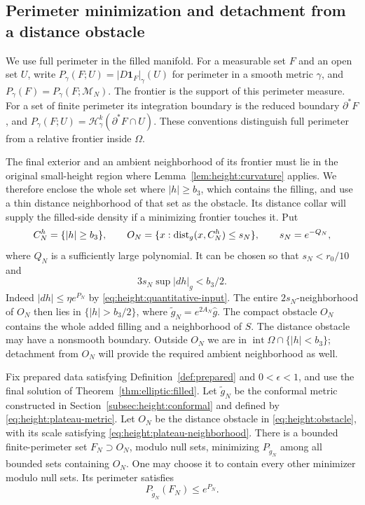 \subsection{Perimeter minimization and detachment from a distance obstacle}

We use full perimeter in the filled manifold.  For a measurable set
$F$ and an open set $U$, write
$P_\gamma(F;U)=|D\mathbf1_F|_\gamma(U)$ for perimeter in a smooth
metric $\gamma$, and $P_\gamma(F)=P_\gamma(F;\mathcal M_N)$.
The frontier is the support of this perimeter measure.  For a set of
finite perimeter its integration boundary is the reduced boundary
$\partial^*F$, and
$P_\gamma(F;U)=\mathcal H^k_\gamma(\partial^*F\cap U)$.
These conventions distinguish full perimeter from a relative frontier
inside $\Omega$.

The final exterior and an ambient neighborhood of its frontier must
lie in the original small-height region where
Lemma~\ref{lem:height:curvature} applies. We therefore enclose the
whole set where $|h|\ge b_3$, which contains the filling, and use a
thin distance neighborhood of that set as the obstacle. Its distance
collar will supply the filled-side density if a minimizing frontier
touches it. Put
\begin{equation}\label{eq:height:obstacle}
 C_N^h=\{|h|\ge b_3\},\qquad
 O_N=\{x:\operatorname{dist}_g(x,C_N^h)\le s_N\},
 \qquad s_N=e^{-Q_N},
\end{equation}
where $Q_N$ is a sufficiently large polynomial.  It can be chosen so
that $s_N<r_0/10$ and
\begin{equation}\label{eq:height:plateau-neighborhood}
 3s_N\sup|dh|_g<b_3/2.
\end{equation}
Indeed $|dh|\le\eta e^{P_N}$ by
\eqref{eq:height:quantitative-input}.  The entire
$2s_N$-neighborhood of $O_N$ then lies in $\{|h|>b_3/2\}$, where
$\widetilde g_N=e^{2A_N}\widehat g$.  The compact obstacle $O_N$
contains the whole added filling and a neighborhood of $S$.
The distance obstacle may have a nonsmooth boundary.  Outside $O_N$
we are in $\operatorname{int}\Omega\cap\{|h|<b_3\}$; detachment from
$O_N$ will provide the required ambient neighborhood as well.

\begin{lemma}
\label{lem:height:BV-existence}
Fix prepared data satisfying Definition~\ref{def:prepared} and
$0<\epsilon<1$, and use the final solution of
Theorem~\ref{thm:elliptic:filled}.  Let $\widetilde g_N$ be the
conformal metric constructed in Section~\ref{subsec:height:conformal}
and defined by \eqref{eq:height:plateau-metric}.  Let $O_N$ be the
distance obstacle in \eqref{eq:height:obstacle}, with its scale satisfying
\eqref{eq:height:plateau-neighborhood}.
There is a bounded finite-perimeter set $F_N\supset O_N$, modulo null
sets, minimizing $P_{\widetilde g_N}$ among all bounded sets containing
$O_N$.  One may choose it to contain every other minimizer modulo null
sets.  Its perimeter satisfies
\begin{equation}\label{eq:height:competitor-bound}
 P_{\widetilde g_N}(F_N)\le e^{P_N}.
\end{equation}
\end{lemma}

